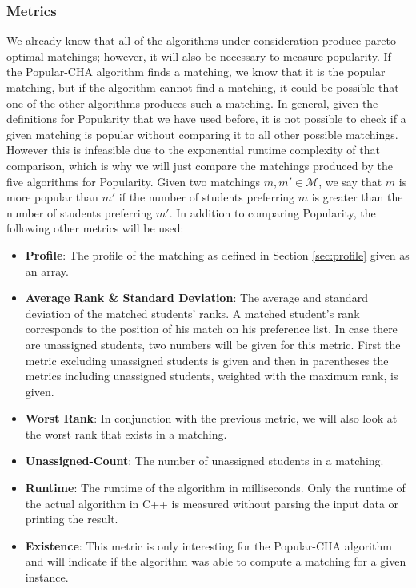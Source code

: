 \subsubsection{Metrics}
We already know that all of the algorithms under consideration produce pareto-optimal matchings; however, it will also be necessary to measure popularity. If the Popular-CHA algorithm finds a matching, we know that it is the popular matching, but if the algorithm cannot find a matching, it could be possible that one of the other algorithms produces such a matching. In general, given the definitions for Popularity that we have used before, it is not possible to check if a given matching is popular without comparing it to all other possible matchings. However this is infeasible due to the exponential runtime complexity of that comparison, which is why we will just compare the matchings produced by the five algorithms for Popularity. Given two matchings $m, m' \in \mathcal{M}$, we say that $m$ is more popular than $m'$ if the number of students preferring $m$ is greater than the number of students preferring $m'$. 
In addition to comparing Popularity, the following other metrics will be used:
\begin{itemize}
  \item \textbf{Profile}: The profile of the matching as defined in Section \ref{sec:profile} given as an array.
  \item \textbf{Average Rank \& Standard Deviation}: The average and standard deviation of the matched students' ranks. A matched student's rank corresponds to the position of his match on his preference list. In case there are unassigned students, two numbers will be given for this metric. First the metric excluding unassigned students is given and then in parentheses the metrics including unassigned students, weighted with the maximum rank, is given.
  \item \textbf{Worst Rank}: In conjunction with the previous metric, we will also look at the worst rank that exists in a matching.
  \item \textbf{Unassigned-Count}: The number of unassigned students in a matching.
  \item \textbf{Runtime}: The runtime of the algorithm in milliseconds. Only the runtime of the actual algorithm in C++ is measured without parsing the input data or printing the result.
  \item \textbf{Existence}: This metric is only interesting for the Popular-CHA algorithm and will indicate if the algorithm was able to compute a matching for a given instance.
\end{itemize}

